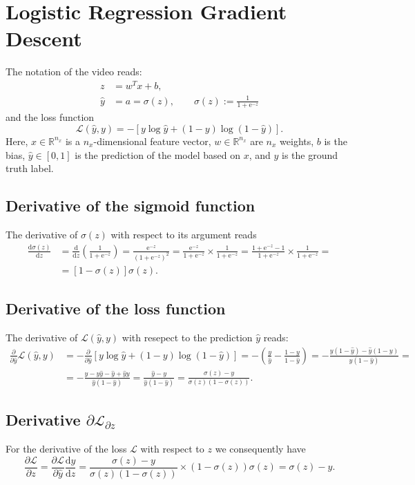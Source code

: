 \documentclass[a4paper,11pt]{article}
\newcommand{\of}[1]{\left( {#1} \right)}
\newcommand{\ofs}[1]{\left[ {#1} \right]}
\newcommand{\fracd}[2]{\frac{\dd{}{#1}}{\dd{}{#2}}}
\newcommand{\fracp}[2]{\frac{\partial{}{#1}}{\partial{}{#2}}}
\newcommand{\dd}{\text{d}}
\newcommand{\ee}{\text{e}}
\begin{document}
\section*{Logistic Regression Gradient Descent}
The notation of the video reads:
\[
\begin{split}
z & = w^T x + b,\\
\hat y &= a = \sigma\of{z}, \qquad \sigma\of{z} := \frac{1}{1 + \ee^{-z}}
\end{split}
\]
and the loss function
\[
\mathcal{L}\of{\hat{y}, y} = - \ofs{y \log\hat{y} + \of{1 - y} \log \of {1 - \hat{y}}}.
\]
Here, $x \in \mathbb{R}^{n_x}$ is a $n_x$-dimensional feature vector,
$w \in \mathbb{R}^{n_x}$ are $n_x$ weights, $b$ is the bias, $\hat{y}
\in [0, 1]$ is the prediction of the model based on $x$, and $y$ is
the ground truth label.

\subsection*{Derivative of the sigmoid function}
The derivative of $\sigma\of{z}$ with respect to its argument reads
\[
\begin{split}
\fracd{\sigma\of{z}}{z} &= \fracd{}{z}\of{\frac{1}{1 + \ee^{-z}}}
                        = \frac{\ee^{-z}}{\of{1 + \ee^{-z}}^2}
                        = \frac{\ee^{-z}}{1 + \ee^{-z}} \times \frac{1}{1 + \ee^{-z}}
                        = \frac{1 + \ee^{-z} - 1}{1 + \ee^{-z}} \times \frac{1}{1 + \ee^{-z}} =\\
                        &= \ofs{1 - \sigma\of{z}} \sigma\of{z}.
\end{split}
\]

\subsection*{Derivative of the loss function}
The derivative of $\mathcal{L}\of{\hat{y}, y}$ with resepect to the prediction $\hat{y}$ reads:
\[
\begin{split}
\fracp{}{\hat{y}} \mathcal{L}\of{\hat{y}, y} &=
- \fracp{}{\hat{y}} \ofs{y \log\hat{y} + \of{1 - y} \log\of{1 - \hat{y}}} =
- \of{\frac{y}{\hat{y}} - \frac{1 - y}{1 - \hat{y}}} =
- \frac{y\of{1-\hat{y}} - \hat{y}\of{1-y}}{\hat{y}\of{1 - \hat{y}}} = \\
&=
- \frac{y - y\hat{y} - \hat{y} + \hat{y}y}{\hat{y}\of{1 - \hat{y}}} =
  \frac{\hat{y} - y}{\hat{y}\of{1 - \hat{y}}} =
  \frac{\sigma\of{z} - y}{\sigma\of{z}\of{1 - \sigma\of{z}}}.
\end{split}
\]

\subsection*{Derivative $\partial\mathcal{L}_{\partial z}$}
For the derivative of the loss $\mathcal{L}$ with respect to $z$ we
consequently have
\[
\fracp{\mathcal{L}}{z} =
\fracp{\mathcal{L}}{\hat{y}} \fracd{\hat{y}}{z} =
\frac{\sigma\of{z} - y}{\sigma\of{z}\of{1 - \sigma\of{z}}} \times \of{1 - \sigma\of{z}}\sigma\of{z} = 
\sigma\of{z} - y.
\]
\end{document}
